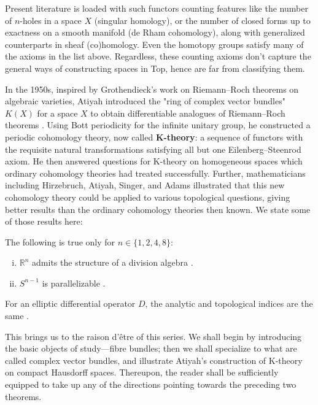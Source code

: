 \documentclass[11pt,a4paper]{article}
\begin{document}

Present literature is loaded with such functors counting features like the number of $n$-holes in a space $X$ (singular homology), or the number of closed forms up to exactness on a smooth manifold (de Rham cohomology), along with generalized counterparts in sheaf (co)homology. Even the homotopy groups satisfy many of the axioms in the list above. Regardless, these counting axioms don't capture the general ways of constructing spaces in Top, hence are far from classifying them.


In the 1950s, inspired by Grothendieck's work on Riemann--Roch theorems on algebraic varieties, Atiyah introduced the "ring of complex vector bundles" $K(X)$ for a space $X$ to obtain differentiable analogues of Riemann--Roch theorems \cite{atiyah1959riemann}. Using Bott periodicity for the infinite unitary group, he constructed a periodic cohomology theory, now called \textbf{K-theory}: a sequence of functors with the requisite natural transformations satisfying all but one Eilenberg--Steenrod axiom. He then answered questions for K-theory on homogeneous spaces which ordinary cohomology theories had treated successfully. Further, mathematicians including Hirzebruch, Atiyah, Singer, and Adams illustrated that this new cohomology theory could be applied to various topological questions, giving better results than the ordinary cohomology theories then known. We state some of those results here:
\begin{theorem}[Frobenius]
The following is true only for $n \in \{1,2,4,8\}$:
\begin{enumerate}[(i)]
    \item $\mathbb{R}^n$ admits the structure of a division algebra \cite{milnor1958some}.
    \item $S^{n-1}$ is parallelizable \cite{atiyah1961bott}.
\end{enumerate}
\end{theorem}

\begin{theorem}
For an elliptic differential operator $D$, the analytic and topological indices are the same \cite{atiyah1968bott}.
\end{theorem}

This brings us to the raison d'\^etre of this series. We shall begin by introducing the basic objects of study---fibre bundles; then we shall specialize to what are called complex vector bundles, and illustrate Atiyah's construction of K-theory on compact Hausdorff spaces. Thereupon, the reader shall be sufficiently equipped to take up any of the directions pointing towards the preceding two theorems.
\end{document}
